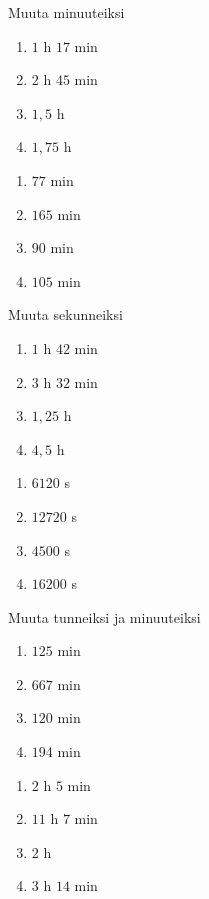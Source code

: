 \begin{tehtava}
Muuta minuuteiksi
\begin{enumerate}
\item $1$ h $17$ min
\item $2$ h $45$ min
\item $1,5$ h
\item $1,75$ h
\end{enumerate}
\begin{vastaus}
\begin{enumerate}
\item $77$ min
\item $165$ min
\item $90$ min
\item $105$ min
\end{enumerate}
\end{vastaus}
\end{tehtava}

\begin{tehtava}
Muuta sekunneiksi
\begin{enumerate}
\item $1$ h $42$ min
\item $3$ h $32$ min
\item $1,25$ h
\item $4,5$ h
\end{enumerate}
\begin{vastaus}
\begin{enumerate}
\item $6120$ s
\item $12720$ s
\item $4500$ s
\item $16200$ s
\end{enumerate}
\end{vastaus}
\end{tehtava}

\begin{tehtava}
Muuta tunneiksi ja minuuteiksi
\begin{enumerate}
\item $125$ min
\item $667$ min
\item $120$ min
\item $194$ min
\end{enumerate}
\begin{vastaus}
\begin{enumerate}
\item $2$ h $5$ min
\item $11$ h $7$ min
\item $2$ h
\item $3$ h $14$ min
\end{enumerate}
\end{vastaus}
\end{tehtava}



